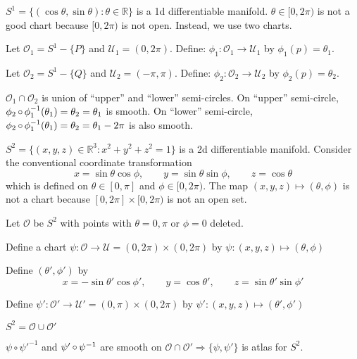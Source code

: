 \documentclass[a4paper,11pt]{article}
\begin{document}
	\begin{ex}
		$S^1 = \{(\cos \theta, \sin \theta): \theta \in \mathbb{R}\}$ is a 1d differentiable manifold. $\theta\in [0,2\pi)$ is not a good chart because $[0,2\pi)$ is not open. Instead, we use two charts. 

		
		Let $\mathcal{O}_1 = S^1 - \{P\}$ and $\mathcal{U}_1 = (0,2\pi)$. Define: $\phi_1: \mathcal{O}_1 \to \mathcal{U}_1$ by $\phi_1(p) = \theta_1$. 
		
		Let $\mathcal{O}_2 = S^1 - \{Q\}$ and $\mathcal{U}_2 = (-\pi,\pi)$. Define: $\phi_2: \mathcal{O}_2 \to \mathcal{U}_2$ by $\phi_2(p) = \theta_2$. 
		
		$\mathcal{O}_1 \cap \mathcal{O}_2$ is union of ``upper'' and ``lower'' semi-circles. On ``upper'' semi-circle, $\phi_2 \operatorname{\circ} \phi_1^{-1}(\theta_1) = \theta_2 = \theta_1$ is smooth. On ``lower'' semi-circle, $\phi_2 \operatorname{\circ} \phi_1^{-1}(\theta_1) = \theta_2 = \theta_1 - 2\pi$ is also smooth.
	\end{ex}

	\begin{ex}
		$S^2 = \{(x,y,z)\in \mathbb{R}^3 : x^2+y^2+z^2 = 1\}$ is a 2d differentiable manifold. Consider the conventional coordinate transformation $$x = \sin \theta \cos \phi,\qquad y = \sin \theta \sin \phi,\qquad z = \cos\theta$$ which is defined on $\theta \in [0,\pi]$ and $\phi \in [0,2\pi)$. The map $(x,y,z) \mapsto (\theta, \phi)$ is not a chart because $[0,2\pi]\times [0,2\pi)$ is not an open set.
		
		Let $\mathcal{O}$ be $S^2$ with points with $\theta = 0, \pi$ or $\phi = 0$ deleted.

		Define a chart $\psi: \mathcal{O} \to \mathcal{U} = (0,2\pi) \times (0,2\pi)$ by $\psi: (x,y,z) \mapsto (\theta,\phi)$
		
		Define $(\theta', \phi')$ by
		\[
			x = -\sin \theta' \cos \phi', \qquad y = \cos \theta', \qquad z = \sin\theta'\sin\phi' 
		\]

		Define $\psi' : \mathcal{O}' \to \mathcal{U}' = (0,\pi)\times (0,2\pi)$ by $\psi' : (x,y,z) \mapsto (\theta',\phi')$ 
		
		$S^2  = \mathcal{O} \cup \mathcal{O}'$

		$\psi \circ \psi'^{-1}$ and $\psi' \operatorname{\circ} \psi^{-1}$ are smooth on $\mathcal{O} \cap \mathcal{O}' \Rightarrow \{\psi,\psi'\}$ is atlas for $S^2$. 

		\needfig{4}
	\end{ex}
\end{document}
